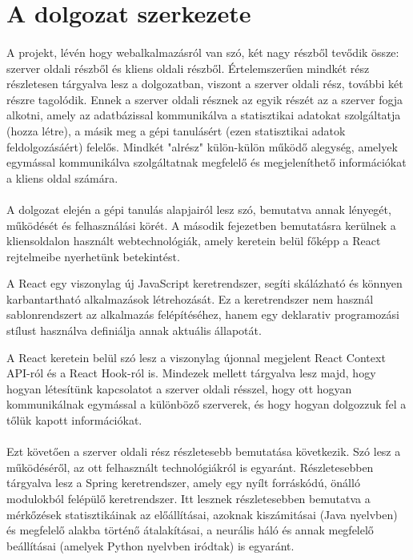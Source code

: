 \section{A dolgozat szerkezete}\label{sec:ALAP:adatelem}
\paragraph{} A projekt, lévén hogy webalkalmazásról van szó, két nagy részből tevődik össze: szerver oldali részből és kliens oldali részből. Értelemszerűen mindkét rész részletesen tárgyalva lesz a dolgozatban, viszont a szerver oldali rész, további két részre tagolódik. Ennek a szerver oldali résznek az egyik részét az a szerver fogja alkotni, amely az adatbázissal kommunikálva a statisztikai adatokat szolgáltatja (hozza létre), a másik meg a gépi tanulásért (ezen statisztikai adatok feldolgozásáért) felelős. Mindkét "alrész" külön-külön működő alegység, amelyek egymással kommunikálva szolgáltatnak megfelelő és megjeleníthető információkat a kliens oldal számára.

\paragraph{} A dolgozat elején a gépi tanulás alapjairól lesz szó, bemutatva annak lényegét, működését és felhasználási körét. A második fejezetben bemutatásra kerülnek a kliensoldalon használt webtechnológiák, amely keretein belül főképp a React rejtelmeibe nyerhetünk betekintést.  

A React egy viszonylag új JavaScript keretrendszer, segíti skálázható és könnyen karbantartható alkalmazások létrehozását. Ez a keretrendszer nem használ sablonrendszert az alkalmazás felépítéséhez, hanem egy deklarativ programozási stílust használva definiálja annak aktuális állapotát.

A React keretein belül szó lesz a viszonylag újonnal megjelent React Context API-ról és a React Hook-ról is. Mindezek mellett tárgyalva lesz majd, hogy hogyan létesítünk kapcsolatot a szerver oldali résszel, hogy ott hogyan kommunikálnak egymással a különböző szerverek, és hogy hogyan dolgozzuk fel a tőlük kapott információkat. 

\paragraph{} Ezt követően a szerver oldali rész részletesebb bemutatása következik. Szó lesz a működéséről, az ott felhasznált technológiákról is egyaránt. Részletesebben tárgyalva lesz a Spring keretrendszer, amely egy nyílt forráskódú, önálló modulokból felépülő keretrendszer. Itt lesznek részletesebben bemutatva a mérkőzések statisztikáinak az előállításai, azoknak kiszámitásai (Java nyelvben) és megfelelő alakba történő átalakításai, a neurális háló és annak megfelelő beállításai (amelyek Python nyelvben iródtak) is egyaránt.

